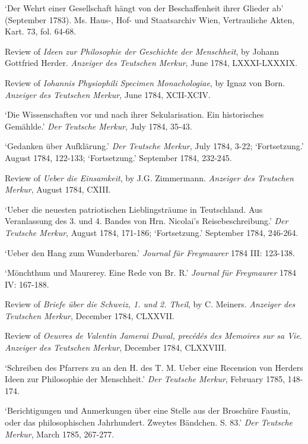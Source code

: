 `Der Wehrt einer Gesellschaft h\"{a}ngt von der Beschaffenheit ihrer Glieder ab' (September 1783). Ms. Haus{-}, Hof{-} und Staatsarchiv Wien, Vertrauliche Akten, Kart. 73, fol. 64{-}68.

Review of \textit{Ideen zur Philosophie der Geschichte der Menschheit}, by Johann Gottfried Herder. \textit{Anzeiger des Teutschen Merkur}, June 1784, LXXXI{-}LXXXIX.

Review of \textit{Iohannis Physiophili Specimen Monachologiae}, by Ignaz von Born. \textit{Anzeiger des Teutschen Merkur}, June 1784, XCII{-}XCIV.

`Die Wissenschaften vor und nach ihrer Sekularisation. Ein historisches Gem\"{a}hlde.' \textit{Der Teutsche Merkur}, July 1784, 35{-}43.

`Gedanken \"{u}ber Aufkl\"{a}rung.' \textit{Der Teutsche Merkur}, July 1784, 3{-}22; `Fortsetzung.' August 1784, 122{-}133; `Fortsetzung.' September 1784, 232{-}245.

Review of \textit{Ueber die Einsamkeit}, by J.G. Zimmermann. \textit{Anzeiger des Teutschen Merkur}, August 1784, CXIII.

`Ueber die neuesten patriotischen Lieblingstr\"{a}ume in Teutschland. Aus Veranlassung des 3. und 4. Bandes von Hrn. Nicolai's Reisebeschreibung.' \textit{Der Teutsche Merkur}, August 1784, 171{-}186; `Fortsetzung.' September 1784, 246{-}264.

`Ueber den Hang zum Wunderbaren.' \textit{Journal f\"{u}r Freymaurer} 1784 III: 123{-}138.

`M\"{o}nchthum und Maurerey. Eine Rede von Br. R\textasteriskcentered \textasteriskcentered .' \textit{Journal f\"{u}r Freymaurer} 1784 IV: 167{-}188.

Review of \textit{Briefe \"{u}ber die Schweiz, 1. und 2. Theil}, by C. Meiners. \textit{Anzeiger des Teutschen Merkur}, December 1784, CLXXVII.

Review of \textit{Oeuvres de Valentin Jamerai Duval, prec\'{e}d\'{e}s des Memoires sur sa Vie}. \textit{Anzeiger des Teutschen Merkur}, December 1784, CLXXVIII.

`Schreiben des Pfarrers zu \textasteriskcentered \textasteriskcentered \textasteriskcentered  an den H. des T. M. Ueber eine Recension von Herders Ideen zur Philosophie der Menschheit.' \textit{Der Teutsche Merkur}, February 1785, 148{-}174.

`Berichtigungen und Anmerkungen \"{u}ber eine Stelle aus der Brosch\"{u}re Faustin, oder das philosophischen Jahrhundert. Zweytes B\"{a}ndchen. S. 83.' \textit{Der Teutsche Merkur}, March 1785, 267{-}277.

